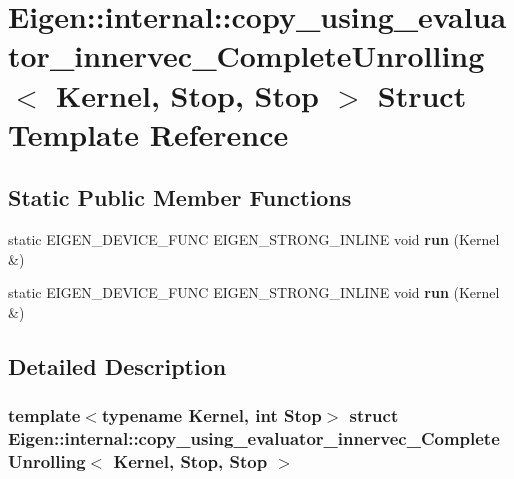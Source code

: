 \hypertarget{struct_eigen_1_1internal_1_1copy__using__evaluator__innervec___complete_unrolling_3_01_kernel_00_01_stop_00_01_stop_01_4}{}\section{Eigen\+:\+:internal\+:\+:copy\+\_\+using\+\_\+evaluator\+\_\+innervec\+\_\+\+Complete\+Unrolling$<$ Kernel, Stop, Stop $>$ Struct Template Reference}
\label{struct_eigen_1_1internal_1_1copy__using__evaluator__innervec___complete_unrolling_3_01_kernel_00_01_stop_00_01_stop_01_4}
\subsection*{Static Public Member Functions}
\begin{DoxyCompactItemize}
\item 
\mbox{\label{struct_eigen_1_1internal_1_1copy__using__evaluator__innervec___complete_unrolling_3_01_kernel_00_01_stop_00_01_stop_01_4_a80a1b7cdacbdcc72795e2800f47ea92d}} 
static E\+I\+G\+E\+N\+\_\+\+D\+E\+V\+I\+C\+E\+\_\+\+F\+U\+NC E\+I\+G\+E\+N\+\_\+\+S\+T\+R\+O\+N\+G\+\_\+\+I\+N\+L\+I\+NE void {\bfseries run} (Kernel \&)
\item 
\mbox{\label{struct_eigen_1_1internal_1_1copy__using__evaluator__innervec___complete_unrolling_3_01_kernel_00_01_stop_00_01_stop_01_4_a80a1b7cdacbdcc72795e2800f47ea92d}} 
static E\+I\+G\+E\+N\+\_\+\+D\+E\+V\+I\+C\+E\+\_\+\+F\+U\+NC E\+I\+G\+E\+N\+\_\+\+S\+T\+R\+O\+N\+G\+\_\+\+I\+N\+L\+I\+NE void {\bfseries run} (Kernel \&)
\end{DoxyCompactItemize}


\subsection{Detailed Description}
\subsubsection*{template$<$typename Kernel, int Stop$>$\newline
struct Eigen\+::internal\+::copy\+\_\+using\+\_\+evaluator\+\_\+innervec\+\_\+\+Complete\+Unrolling$<$ Kernel, Stop, Stop $>$}



